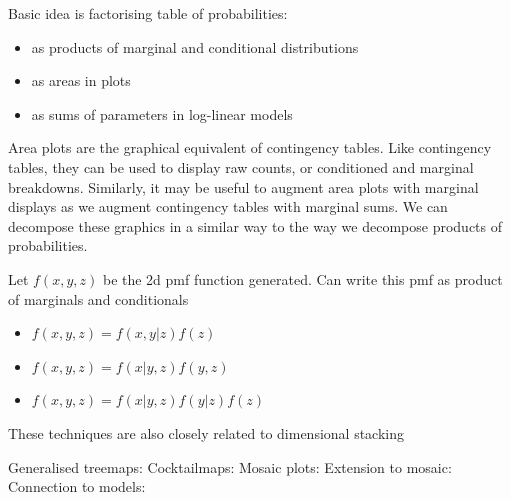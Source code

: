 \documentclass[letterpaper,oneside]{scrartcl}
\begin{document}
Basic idea is factorising table of probabilities:

\begin{itemize}
  \item as products of marginal and conditional distributions
  \item as areas in plots
  \item as sums of parameters in log-linear models
\end{itemize}

Area plots are the graphical equivalent of contingency tables. Like contingency tables, they can be used to display raw counts, or conditioned and marginal breakdowns. Similarly, it may be useful to augment area plots with marginal displays as we augment contingency tables with marginal sums.  We can decompose these graphics in a similar way to the way we decompose products of probabilities.

Let $f(x, y, z)$ be the 2d pmf function generated.  Can write this pmf as product of marginals and conditionals

\begin{itemize}
  \item $f(x, y, z) = f(x, y | z) f(z)$
  \item $f(x, y, z) = f(x | y, z) f(y, z)$
  \item $f(x, y, z) = f(x | y, z) f(y | z) f(z)$
\end{itemize}

These techniques are also closely related to dimensional stacking \citep{leblanc:1990}

Generalised treemaps: \citep{vliegen:2006}
Cocktailmaps: \citep{ahlberg:1996}
Mosaic plots: \citep{hartigan:1984,hartigan:1981,friendly:1994,hofmann:2003}
Extension to mosaic: \citep{friendly:1999,hofmann:2000}
Connection to models: \citep{theus:1999,hofmann:2001}


%
%
%
%
\end{document}
